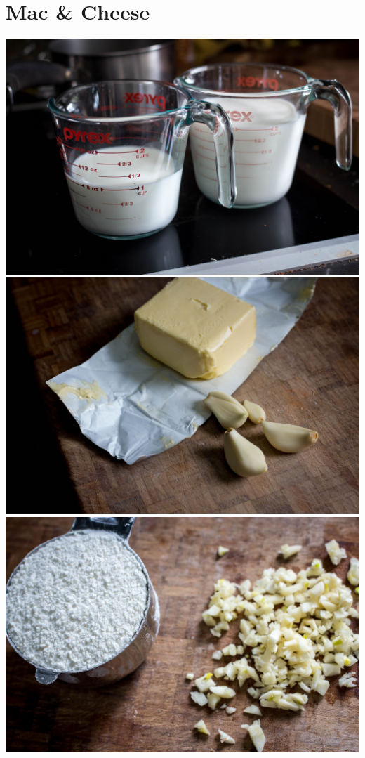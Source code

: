 \chapter*{Mac \& Cheese}
\renewcommand{\chaptertitle}{Mac \& Cheese}

\includegraphics[width=\textwidth]{food/mac-n-cheese/images/hi-res/01.jpg}
\newpage
\includegraphics[width=\textwidth]{food/mac-n-cheese/images/hi-res/02.jpg}
\newpage
\includegraphics[width=\textwidth]{food/mac-n-cheese/images/hi-res/03.jpg}
